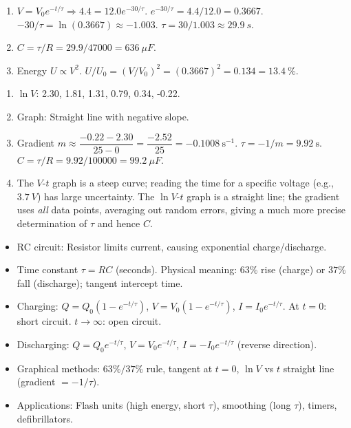 \documentclass[11pt]{article}
\begin{document}
\begin{corrige}[Exercise 2]
\begin{enumerate}
    \item $V = V_0 e^{-t/\tau} \Rightarrow 4.4 = 12.0 e^{-30/\tau}$.
        $e^{-30/\tau} = 4.4/12.0 = 0.3667$.
        $-30/\tau = \ln(0.3667) \approx -1.003$.
        $\tau = 30 / 1.003 \approx \SI{29.9}{s}$.
    \item $C = \tau/R = 29.9 / 47000 = \SI{636}{\mu F}$.
    \item Energy $U \propto V^2$. $U/U_0 = (V/V_0)^2 = (0.3667)^2 = 0.134 = \SI{13.4}{\%}$.
\end{enumerate}
\end{corrige}

\begin{corrige}[Exercise 3]
\begin{enumerate}
    \item $\ln V$: 2.30, 1.81, 1.31, 0.79, 0.34, -0.22.
    \item Graph: Straight line with negative slope.
    \item Gradient $m \approx \dfrac{-0.22 - 2.30}{25 - 0} = \dfrac{-2.52}{25} = -0.1008\ \mathrm{s^{-1}}$.
        $\tau = -1/m = 9.92\ \mathrm{s}$.
        $C = \tau/R = 9.92 / 100000 = \SI{99.2}{\mu F}$.
    \item The $V$-$t$ graph is a steep curve; reading the time for a specific voltage (e.g., $\SI{3.7}{V}$) has large uncertainty. The $\ln V$-$t$ graph is a straight line; the gradient uses \emph{all} data points, averaging out random errors, giving a much more precise determination of $\tau$ and hence $C$.
\end{enumerate}
\end{corrige}

\begin{aretenir}
\begin{itemize}
    \item RC circuit: Resistor limits current, causing exponential charge/discharge.
    \item Time constant $\tau = RC$ (seconds). Physical meaning: $63\%$ rise (charge) or $37\%$ fall (discharge); tangent intercept time.
    \item Charging: $Q=Q_0(1-e^{-t/\tau})$, $V=V_0(1-e^{-t/\tau})$, $I=I_0 e^{-t/\tau}$. At $t=0$: short circuit. $t\to\infty$: open circuit.
    \item Discharging: $Q=Q_0 e^{-t/\tau}$, $V=V_0 e^{-t/\tau}$, $I=-I_0 e^{-t/\tau}$ (reverse direction).
    \item Graphical methods: $63\%/37\%$ rule, tangent at $t=0$, $\ln V$ vs $t$ straight line (gradient $=-1/\tau$).
    \item Applications: Flash units (high energy, short $\tau$), smoothing (long $\tau$), timers, defibrillators.
\end{itemize}
\end{aretenir}
\end{document}
